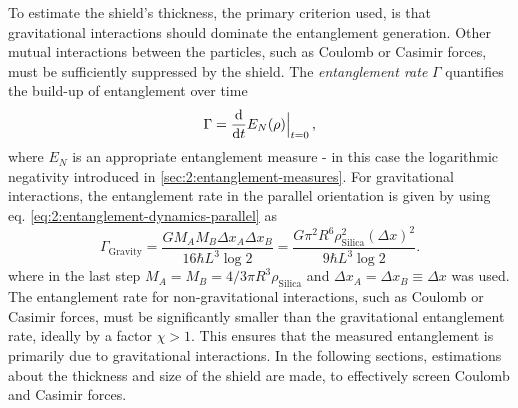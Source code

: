 To estimate the shield's thickness, the primary criterion used, is that gravitational interactions should dominate the entanglement generation.
Other mutual interactions between the particles, such as Coulomb or Casimir forces, must be sufficiently suppressed by the shield.
The \emph{entanglement rate} $\Gamma$ quantifies the build-up of entanglement over time
\begin{equation}\label{eq:5:entanglement-rate}
  \Gamma = \dv{t} E_N(\rho)\Big|_{t=0} \, ,
\end{equation} 
where $E_N$ is an appropriate entanglement measure - in this case the logarithmic negativity \cite{Plenio_2005} introduced in \cref{sec:2:entanglement-measures}.
For gravitational interactions, the entanglement rate in the parallel orientation is given by using eq. \eqref{eq:2:entanglement-dynamics-parallel} as
\begin{equation}\label{eq:5:entanglement-rate-gravity}
  \Gamma_\mathrm{Gravity} = \frac{G M_A M_B \Delta x_A \Delta x_B}{16 \hbar L^3 \log 2} = \frac{G \pi^2 R^6 \rho_\mathrm{Silica}^2 (\Delta x)^2}{9 \hbar L^3 \log 2} .
\end{equation}
where in the last step $M_A = M_B = 4/3 \pi R^3 \rho_\mathrm{Silica}$ and $\Delta x_A = \Delta x_B \equiv \Delta x$ was used.
The entanglement rate for non-gravitational interactions, such as Coulomb or Casimir forces, must be significantly smaller than the gravitational entanglement rate, ideally by a factor $\chi > 1$.
This ensures that the measured entanglement is primarily due to gravitational interactions.
In the following sections, estimations about the thickness and size of the shield are made, to effectively screen Coulomb and Casimir forces.


